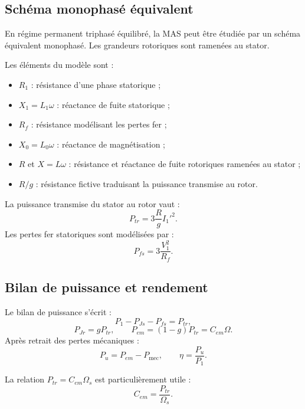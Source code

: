 \subsection{Schéma monophasé équivalent}

En régime permanent triphasé équilibré, la MAS peut être étudiée par un schéma équivalent monophasé. Les grandeurs rotoriques sont ramenées au stator.

\begin{center}\TLSchemaEquivalentMAS\end{center}

Les éléments du modèle sont :
\begin{itemize}
  \item $R_1$ : résistance d'une phase statorique ;
  \item $X_1=L_1\omega$ : réactance de fuite statorique ;
  \item $R_f$ : résistance modélisant les pertes fer ;
  \item $X_0=L_0\omega$ : réactance de magnétisation ;
  \item $R$ et $X=L\omega$ : résistance et réactance de fuite rotoriques ramenées au stator ;
  \item $R/g$ : résistance fictive traduisant la puissance transmise au rotor.
\end{itemize}

La puissance transmise du stator au rotor vaut :
\[
\boxed{P_{tr}=3\frac{R}{g}{I_1'}^2.}
\]
Les pertes fer statoriques sont modélisées par :
\[
\boxed{P_{fs}=3\frac{V_1^2}{R_f}.}
\]


\subsection{Bilan de puissance et rendement}

\begin{center}\TLBilanPuissanceMAS\end{center}

Le bilan de puissance s'écrit :
\[
P_1-P_{Js}-P_{fs}=P_{tr},
\]
\[
\boxed{P_{Jr}=gP_{tr},}
\qquad
\boxed{P_{em}=(1-g)P_{tr}=C_{em}\Omega.}
\]
Après retrait des pertes mécaniques :
\[
P_u=P_{em}-P_{\mathrm{mec}},
\qquad
\boxed{\eta=\frac{P_u}{P_1}.}
\]

La relation $P_{tr}=C_{em}\Omega_s$ est particulièrement utile :
\[
\boxed{C_{em}=\frac{P_{tr}}{\Omega_s}.}
\]


